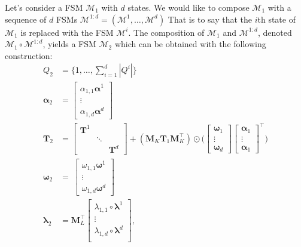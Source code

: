 Let's consider a FSM $\mathcal{M}_1$ with $d$ states. We would like to
compose $\mathcal{M}_1$ with a sequence of $d$ FSMs
$\mathcal{M}^{1:d} = (\mathcal{M}^1, \dots, \mathcal{M}^d)$
That is to say that the $i$th state of $\mathcal{M}_1$ is replaced
with the FSM $\mathcal{M}^i$. The composition of $\mathcal{M}_1$ and
$\mathcal{M}^{1:d}$, denoted $\mathcal{M}_1 \circ \mathcal{M}^{1:d}$,
yields a FSM $\mathcal{M}_2$ which can be obtained with the following
construction:
\begin{align}
    Q_2 &= \{1, \dots, \sum_{i=1}^d |Q^i| \} \\
    \boldsymbol{\alpha}_2 &=
        \begin{bmatrix}
            \alpha_{1,1} \boldsymbol{\alpha}^1 \\
            \vdots \\
            \alpha_{1,d} \boldsymbol{\alpha}^d
        \end{bmatrix} \\
    \mathbf{T}_2 &= \begin{bmatrix}
        \mathbf{T}^1 & & \\
        & \ddots & \\
        & & \mathbf{T}^d
    \end{bmatrix} + (\mathbf{M}_K \mathbf{T}_1 \mathbf{M}_K^\top) \odot
        \Bigg( \begin{bmatrix}
            \boldsymbol{\omega}_1 \\
            \vdots \\
            \boldsymbol{\omega}_d
        \end{bmatrix} \begin{bmatrix}
            \boldsymbol{\alpha}_1\\
            \vdots \\
            \boldsymbol{\alpha}_1
        \end{bmatrix}^\top \Bigg)  \\
    \boldsymbol{\omega}_2 &= \
        \begin{bmatrix}
            \omega_{1,1} \boldsymbol{\omega}^1 \\
            \vdots \\
            \omega_{1,d} \boldsymbol{\omega}^d
        \end{bmatrix} \\
    \boldsymbol{\lambda}_2 &= \mathbf{M}_L^\top \begin{bmatrix}
        \lambda_{1,1} \circ \boldsymbol{\lambda}^1 \\
        \vdots \\
        \lambda_{1,d} \circ \boldsymbol{\lambda}^d \\
    \end{bmatrix},
\end{align}
